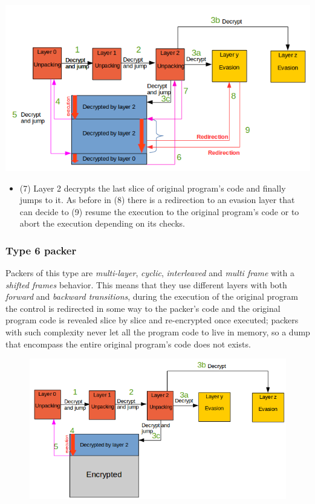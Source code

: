 \includegraphics[width=1.1\textwidth]{pictures/packer_type_5-3.png}

\begin{itemize}
\item (7) Layer 2 decrypts the last slice of original program's code and finally jumps to it. As before in (8) there is a redirection to an evasion layer that can decide to (9) resume the execution to the original program's code or to abort the execution depending on its checks.
\end{itemize}

\subsubsection{Type 6 packer}

Packers of this type are \textit{multi-layer}, \textit{cyclic}, \textit{interleaved} and \textit{multi frame} with a \textit{shifted frames} behavior. This means that they use different layers with both \textit{forward} and \textit{backward transitions}, during the execution of the original program the control is redirected in some way to the packer's code and the original program code is revealed slice by slice and re-encrypted once executed; packers with such complexity never let all the program code to live in memory, so a dump that encompass the entire original program's code does not exists.

\begin{figure}[!ht]
\begin{center}
\includegraphics[width=1\textwidth]{pictures/packer_type_5-1.png}
\end{center}
\end{figure}


